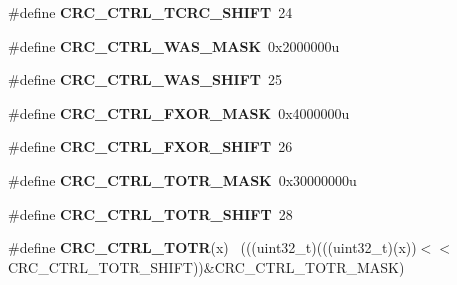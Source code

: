 \begin{DoxyCompactItemize}
\item 
\hypertarget{group___c_r_c___register___masks_ga7c3cc17a7bc8f6c0621f3ce91e7b2b3e}{}\#define {\bfseries C\+R\+C\+\_\+\+C\+T\+R\+L\+\_\+\+T\+C\+R\+C\+\_\+\+S\+H\+I\+F\+T}~24\label{group___c_r_c___register___masks_ga7c3cc17a7bc8f6c0621f3ce91e7b2b3e}

\item 
\hypertarget{group___c_r_c___register___masks_gaf3955c626d1b33289184fdc8a8a09147}{}\#define {\bfseries C\+R\+C\+\_\+\+C\+T\+R\+L\+\_\+\+W\+A\+S\+\_\+\+M\+A\+S\+K}~0x2000000u\label{group___c_r_c___register___masks_gaf3955c626d1b33289184fdc8a8a09147}

\item 
\hypertarget{group___c_r_c___register___masks_gaf0d0849f057da668b51b759b7a2ba70f}{}\#define {\bfseries C\+R\+C\+\_\+\+C\+T\+R\+L\+\_\+\+W\+A\+S\+\_\+\+S\+H\+I\+F\+T}~25\label{group___c_r_c___register___masks_gaf0d0849f057da668b51b759b7a2ba70f}

\item 
\hypertarget{group___c_r_c___register___masks_ga7c59a3459d15bbbf8ae8bbcc208a1b31}{}\#define {\bfseries C\+R\+C\+\_\+\+C\+T\+R\+L\+\_\+\+F\+X\+O\+R\+\_\+\+M\+A\+S\+K}~0x4000000u\label{group___c_r_c___register___masks_ga7c59a3459d15bbbf8ae8bbcc208a1b31}

\item 
\hypertarget{group___c_r_c___register___masks_ga99bb491c03e22125b5053167bf361218}{}\#define {\bfseries C\+R\+C\+\_\+\+C\+T\+R\+L\+\_\+\+F\+X\+O\+R\+\_\+\+S\+H\+I\+F\+T}~26\label{group___c_r_c___register___masks_ga99bb491c03e22125b5053167bf361218}

\item 
\hypertarget{group___c_r_c___register___masks_ga1af35cbb29862b18aee64fd4f32bca07}{}\#define {\bfseries C\+R\+C\+\_\+\+C\+T\+R\+L\+\_\+\+T\+O\+T\+R\+\_\+\+M\+A\+S\+K}~0x30000000u\label{group___c_r_c___register___masks_ga1af35cbb29862b18aee64fd4f32bca07}

\item 
\hypertarget{group___c_r_c___register___masks_gab309d177a917d972212c78481cf25d4d}{}\#define {\bfseries C\+R\+C\+\_\+\+C\+T\+R\+L\+\_\+\+T\+O\+T\+R\+\_\+\+S\+H\+I\+F\+T}~28\label{group___c_r_c___register___masks_gab309d177a917d972212c78481cf25d4d}

\item 
\hypertarget{group___c_r_c___register___masks_gad9b6420cda76f25cebee4315a10317e6}{}\#define {\bfseries C\+R\+C\+\_\+\+C\+T\+R\+L\+\_\+\+T\+O\+T\+R}(x)                                              ~(((uint32\+\_\+t)(((uint32\+\_\+t)(x))$<$$<$C\+R\+C\+\_\+\+C\+T\+R\+L\+\_\+\+T\+O\+T\+R\+\_\+\+S\+H\+I\+F\+T))\&C\+R\+C\+\_\+\+C\+T\+R\+L\+\_\+\+T\+O\+T\+R\+\_\+\+M\+A\+S\+K)\label{group___c_r_c___register___masks_gad9b6420cda76f25cebee4315a10317e6}


\end{DoxyCompactItemize}

